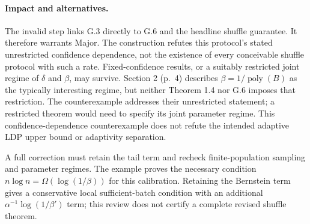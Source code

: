 \documentclass[10pt]{article}
\begin{document}
\paragraph*{Impact and alternatives.}\mbox{}\par
The invalid step links G.3 directly to G.6 and the headline shuffle guarantee. It therefore warrants Major. The construction refutes this protocol’s stated unrestricted confidence dependence, not the existence of every conceivable shuffle protocol with such a rate. Fixed-confidence results, or a suitably restricted joint regime of \(\delta\) and \(\beta\), may survive. Section 2 (p. 4) describes \(\beta=1/\operatorname{poly}(B)\) as the typically interesting regime, but neither Theorem 1.4 nor G.6 imposes that restriction. The counterexample addresses their unrestricted statement; a restricted theorem would need to specify its joint parameter regime. This confidence-dependence counterexample does not refute the intended adaptive LDP upper bound or adaptivity separation.\par
A full correction must retain the tail term and recheck finite-population sampling and parameter regimes. The example proves the necessary condition \(n\log n=\Omega(\log(1/\beta))\) for this calibration. Retaining the Bernstein term gives a conservative local sufficient-batch condition with an additional \(\alpha^{-1}\log(1/\beta')\) term; this review does not certify a complete revised shuffle theorem.\par
\end{document}
